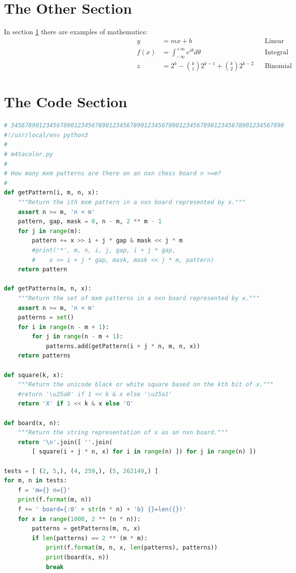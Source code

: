 \documentclass[11pt]{article}%
\begin{document}
\begin{multicols*}{2}
\section{The Other Section}
\label{The Other Section}

In section \ref{The Other Section} there are examples of
mathematics:\begin{align}
y &= mx+b && \text{Linear} \\
f(x) &= \int_{-\infty}^{+\infty} e^{i\theta} d\theta && \text{Integral} \\
z &= 2^k-\binom{k}{1}2^{k-1}+\binom{k}{2}2^{k-2} &&\text{Binomial}
\end{align}

\section{The Code Section}
\label{The Code Section}

\begin{lstlisting}[language=Python,caption=\code{m4tacolor.py} module,label=m4tacolor]
# 345678901234567890123456789012345678901234567890123456789012345678901234567890
#!/usr/local/env python3
#
# m4tacolor.py
#
# How many mxm patterns are there on an nxn chess board n >=m?
#
def getPattern(i, m, n, x):
    """Return the ith mxm pattern in a nxn board represented by x."""
    assert n >= m, 'n < m'
    pattern, gap, mask = 0, n - m, 2 ** m - 1
    for j in range(m):
        pattern += x >> i + j * gap & mask << j * m
        #print('*', m, n, i, j, gap, i + j * gap, 
        #    x >> i + j * gap, mask, mask << j * m, pattern)
    return pattern

def getPatterns(m, n, x):
    """Return the set of mxm patterns in a nxn board represented by x."""
    assert n >= m, 'n < m'
    patterns = set()
    for i in range(n - m + 1):
        for j in range(n - m + 1):
            patterns.add(getPattern(i + j * n, m, n, x))
    return patterns

def square(k, x):
    """Return the unicode black or white square based on the kth bit of x."""
    #return '\u25a0' if 1 << k & x else '\u25a1'
    return 'X' if 1 << k & x else 'O'

def board(x, n):
    """Return the string representation of x as an nxn board."""
    return '\n'.join([ ''.join(
        [ square(i + j * n, x) for i in range(n) ]) for j in range(n) ])

tests = [ (2, 5,), (4, 259,), (5, 262149,) ]
for m, n in tests:
    f = 'm={} n={}'
    print(f.format(m, n))
    f += ' board={:0' + str(n * n) + 'b} {}=len({})'
    for x in range(1000, 2 ** (n * n)):
        patterns = getPatterns(m, n, x)
        if len(patterns) == 2 ** (m * m):
            print(f.format(m, n, x, len(patterns), patterns))
            print(board(x, n))
            break
\end{lstlisting}


\end{multicols*}
\end{document}
